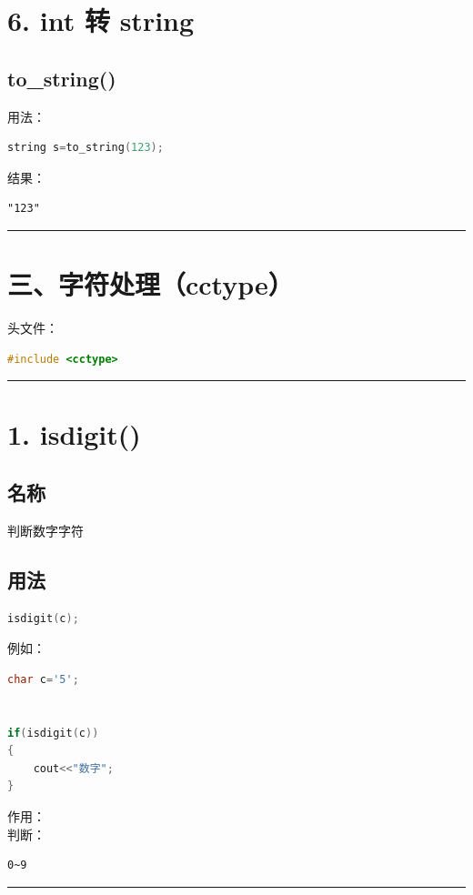 \documentclass[10pt,twocolumn]{extarticle}
\begin{document}
\section{6. int 转 string}

\subsection{to\_string()}
用法：
\begin{lstlisting}[language=C++]
string s=to_string(123);
\end{lstlisting}
结果：
\begin{lstlisting}
"123"
\end{lstlisting}

\noindent\rule{\linewidth}{0.4pt}

\section{三、字符处理（cctype）}

头文件：
\begin{lstlisting}[language=C++]
#include <cctype>
\end{lstlisting}

\noindent\rule{\linewidth}{0.4pt}

\section{1. isdigit()}

\subsection{名称}
判断数字字符

\subsection{用法}
\begin{lstlisting}[language=C++]
isdigit(c);
\end{lstlisting}
例如：
\begin{lstlisting}[language=C++]
char c='5';


if(isdigit(c))
{
    cout<<"数字";
}
\end{lstlisting}
作用：\\
判断：
\begin{lstlisting}
0~9
\end{lstlisting}

\noindent\rule{\linewidth}{0.4pt}
\end{document}
